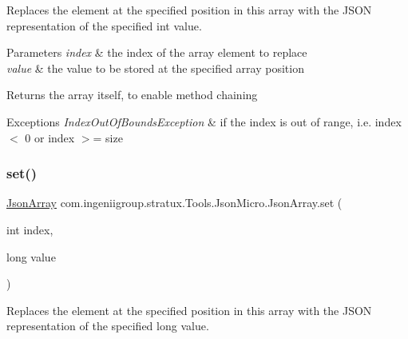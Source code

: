 Replaces the element at the specified position in this array with the J\+S\+ON representation of the specified {\ttfamily int} value.


\begin{DoxyParams}{Parameters}
{\em index} & the index of the array element to replace \\
\hline
{\em value} & the value to be stored at the specified array position \\
\hline
\end{DoxyParams}
\begin{DoxyReturn}{Returns}
the array itself, to enable method chaining 
\end{DoxyReturn}

\begin{DoxyExceptions}{Exceptions}
{\em Index\+Out\+Of\+Bounds\+Exception} & if the index is out of range, i.\+e. {\ttfamily index $<$ 0} or {\ttfamily index $>$= size} \\
\hline
\end{DoxyExceptions}
\mbox{\label{classcom_1_1ingeniigroup_1_1stratux_1_1_tools_1_1_json_micro_1_1_json_array_a0431b6548fd8ba4643bc6aadb8718e8f}} 
\subsubsection{\texorpdfstring{set()}{set()}\hspace{0.1cm}{\footnotesize\ttfamily [2/7]}}
{\footnotesize\ttfamily \hyperlink{classcom_1_1ingeniigroup_1_1stratux_1_1_tools_1_1_json_micro_1_1_json_array}{Json\+Array} com.\+ingeniigroup.\+stratux.\+Tools.\+Json\+Micro.\+Json\+Array.\+set (\begin{DoxyParamCaption}\item[{int}]{index,  }\item[{long}]{value }\end{DoxyParamCaption})}

Replaces the element at the specified position in this array with the J\+S\+ON representation of the specified {\ttfamily long} value.


